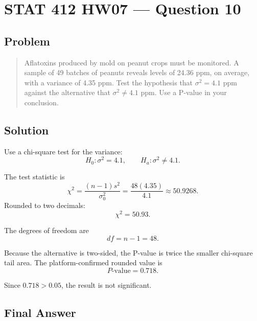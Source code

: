 \documentclass[11pt]{article}
\begin{document}
\section*{STAT 412 HW07 --- Question 10}

\subsection*{Problem}

\begin{quote}
Aflatoxins produced by mold on peanut crops must be monitored. A sample of 49 batches of peanuts reveals levels of 24.36 ppm, on average, with a variance of 4.35 ppm. Test the hypothesis that $\sigma^2=4.1$ ppm against the alternative that $\sigma^2\ne4.1$ ppm. Use a P-value in your conclusion.
\end{quote}

\subsection*{Solution}

Use a chi-square test for the variance:
\[
H_0:\sigma^2=4.1,\qquad H_a:\sigma^2\ne4.1.
\]

The test statistic is
\[
\chi^2=\frac{(n-1)s^2}{\sigma_0^2}
      =\frac{48(4.35)}{4.1}
      \approx 50.9268.
\]
Rounded to two decimals:
\[
\chi^2=50.93.
\]

The degrees of freedom are
\[
df=n-1=48.
\]

Because the alternative is two-sided, the P-value is twice the smaller chi-square tail area. The platform-confirmed rounded value is
\[
P\text{-value}=0.718.
\]

Since $0.718>0.05$, the result is not significant.

\subsection*{Final Answer}

\end{document}
